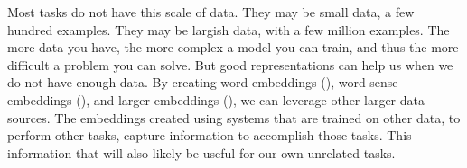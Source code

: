\documentclass[12pt,parskip]{komatufte}
\begin{document}
Most tasks do not have this scale of data.
They may be small data, a few hundred examples.
They may be largish data, with a few million examples.
The more data you have, the more complex a model you can train,
and thus the more difficult a problem you can solve.
But good representations can help us when we do not have enough data.
By creating word embeddings (),
word sense embeddings (),
and larger embeddings (),
we can leverage other larger data sources.
The embeddings created using systems that are trained on other data, to perform other tasks,
capture information to accomplish those tasks.
This information that will also likely be useful for our own unrelated tasks.
\end{document}
